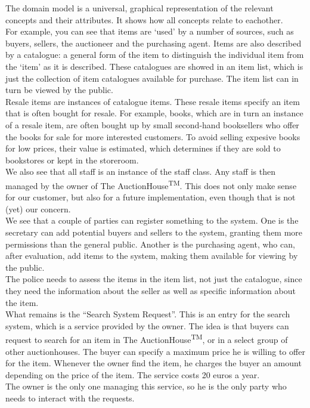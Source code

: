 The domain model is a universal, graphical representation of the relevant concepts and their attributes. It shows how all concepts relate to eachother.\\
For example, you can see that items are `used' by a number of sources, such as buyers, sellers, the auctioneer and the purchasing agent. Items are also described by a catalogue: a general form of the item to distinguish the individual item from the `item' as it is described. These catalogues are showed in an item list, which is just the collection of item catalogues available for purchase. The item list can in turn be viewed by the public.\\
Resale items are instances of catalogue items. These resale items specify an item that is often bought for resale. For example, books, which are in turn an instance of a resale item, are often bought up by small second-hand booksellers who offer the books for sale for more interested customers. To avoid selling expesive books for low prices, their value is estimated, which determines if they are sold to bookstores or kept in the storeroom.\\
We also see that all staff is an instance of the staff class. Any staff is then managed by the owner of The AuctionHouse\textsuperscript{TM}. This does not only make sense for our customer, but also for a future implementation, even though that is not (yet) our concern.\\
We see that a couple of parties can register something to the system. One is the secretary can add potential buyers and sellers to the system, granting them more permissions than the general public. Another is the purchasing agent, who can, after evaluation, add items to the system, making them available for viewing by the public.\\
The police needs to assess the items in the item list, not just the catalogue, since they need the information about the seller as well as specific information about the item.\\
What remains is the ``Search System Request''. This is an entry for the search system, which is a service provided by the owner. The idea is that buyers can request to search for an item in The AuctionHouse\textsuperscript{TM}, or in a select group of other auctionhouses. The buyer can specify a maximum price he is willing to offer for the item. Whenever the owner find the item, he charges the buyer an amount depending on the price of the item. The service costs 20 euros a year.\\
The owner is the only one managing this service, so he is the only party who needs to interact with the requests.